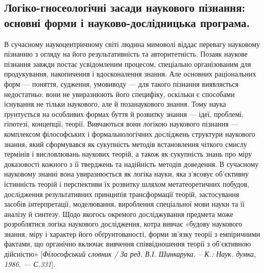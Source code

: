 \subsection[Логіко-гносеологічні засади наукового пізнання.]{Логіко-гносеологічні засади наукового пізнання: основні форми і науково-дослідницька програма.}
В сучасному наукоцентричному світі
людина мимоволі віддає перевагу науковому пізнанню з огляду на його
результативність та авторитетність. Позаяк наукове пізнання завжди постає
усвідомленим процесом, спеціально організованим для продукування,
накопичення і вдосконалення знання. Але основних раціональних форм ---
поняття, судження, умовиводу --- для такого пізнання виявляється недостатньо:
вони не увиразнюють його специфіку, оскільки є способами існування не
тільки наукового, але й позанаукового знання. Тому наука ґрунтується на
особливих формах буття й розвитку знання --- ідеї, проблемі, гіпотезі, концепції,
теорії. Вивчаються вони логікою наукового пізнання --- комплексом
філософських і формальнологічних досліджень структури наукового знання,
який сформувався як сукупність методів встановлення чіткого смислу термінів і
висловлювань наукових теорій, а також як сукупність знань про міру
доказовості кожного з її тверджень та надійність методів доведення. В
сучасному науковому знанні вона увиразнюється як логіка науки, яка з’ясовує
об’єктивну істинність теорій і перспективи їх розвитку шляхом
метатеоретичних побудов, дослідження результативних принципів
трансформації теорій, застосування засобів інтерпретації, моделювання,
вироблення спеціальної мови науки та її аналізу й синтезу. Щодо якогось
окремого досліджування предмета може розроблятися логіка наукового
дослідження, котра вивчає «будову наукового знання, міру і характер його
обґрунтованості, форми зв’язку теорії з емпіричними фактами, що органічно
включає вивчення співвідношення теорії з об’єктивною дійсністю»
[\textit{Філософський словник / За ред. В.І. Шинкарука. – К.: Наук. думка, 1986. ---
С.331}].

